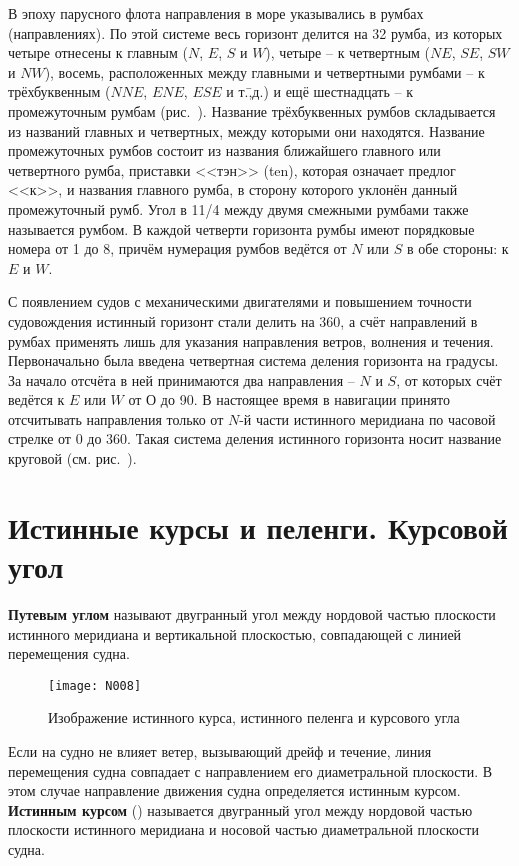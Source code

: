 В эпоху парусного флота направления в море указывались в румбах
(направлениях). По этой системе весь горизонт делится на 32 румба, из
которых четыре отнесены к главным ($N$, $E$, $S$ и $W$), четыре \--- к
четвертным ($NE$, $SE$, $SW$ и $NW$), восемь, расположенных между
главными и четвертными румбами \--- к трёхбуквенным ($NNE$, $ENE$,
$ESE$ и т.\=,д.) и ещё шестнадцать \--- к промежуточным румбам
(рис.~). Название трёхбуквенных румбов складывается из
названий главных и четвертных, между которыми они находятся. Название
промежуточных румбов состоит из названия ближайшего главного или
четвертного румба, приставки <<тэн>> (ten), которая означает предлог
<<к>>, и названия главного румба, в сторону которого уклонён данный
промежуточный румб. Угол в 11/4 между двумя смежными румбами
также называется румбом. В каждой четверти горизонта румбы имеют
порядковые номера от 1 до 8, причём нумерация румбов ведётся от $N$
или $S$ в обе стороны: к $E$ и $W$.

С появлением судов с механическими двигателями и повышением точности
судовождения истинный горизонт стали делить на 360\gr, а счёт
направлений в румбах применять лишь для указания направления ветров,
волнения и течения. Первоначально была введена четвертная система
деления горизонта на градусы. За начало отсчёта в ней принимаются два
направления \--- $N$ и $S$, от которых счёт ведётся к $E$ или $W$ от О
до 90\gr. В настоящее время в навигации принято отсчитывать
направления только от $N$-й части истинного меридиана по часовой
стрелке от 0 до 360\gr. Такая система деления истинного горизонта
носит название круговой (см. рис.~).

\section{Истинные курсы и пеленги. Курсовой угол} 

\textbf{Путевым углом} называют двугранный угол
между нордовой частью плоскости истинного меридиана и вертикальной
плоскостью, совпадающей с линией перемещения судна.

\begin{figure}[htb]
  \centering{}
  \texttt{[image: N008]}
  \caption{Изображение истинного курса, истинного пеленга и курсового угла}
  \label{fig:N8}
\end{figure}

Если на судно не влияет ветер, вызывающий дрейф и течение, линия
перемещения судна совпадает с направлением его диаметральной
плоскости. В этом случае направление движения судна определяется
истинным курсом. \textbf{Истинным курсом} (\IK) называется двугранный
угол между нордовой частью плоскости истинного меридиана и носовой
частью диаметральной плоскости судна.

